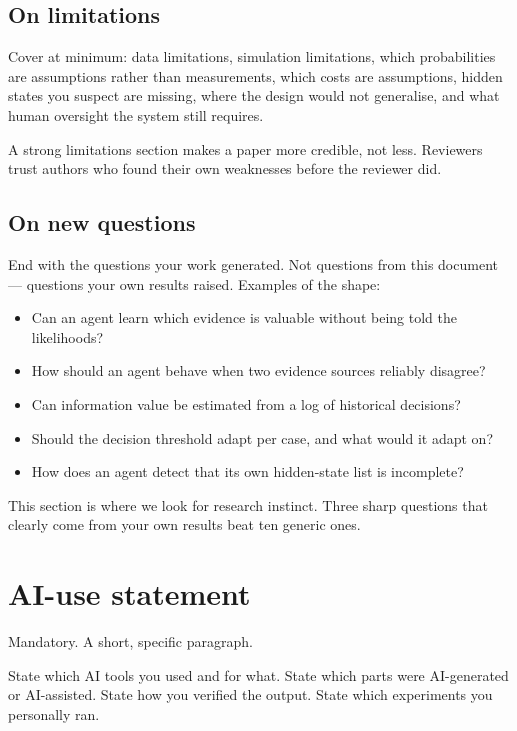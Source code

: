 \documentclass[11pt,a4paper]{article}
\begin{document}
\subsection{On limitations}

Cover at minimum: data limitations, simulation limitations, which probabilities are assumptions
rather than measurements, which costs are assumptions, hidden states you suspect are missing,
where the design would not generalise, and what human oversight the system still requires.

A strong limitations section makes a paper more credible, not less. Reviewers trust authors who
found their own weaknesses before the reviewer did.

\subsection{On new questions}

End with the questions your work generated. Not questions from this document --- questions your
own results raised. Examples of the shape:

\begin{itemize}
  \item Can an agent learn which evidence is valuable without being told the likelihoods?
  \item How should an agent behave when two evidence sources reliably disagree?
  \item Can information value be estimated from a log of historical decisions?
  \item Should the decision threshold adapt per case, and what would it adapt on?
  \item How does an agent detect that its own hidden-state list is incomplete?
\end{itemize}

This section is where we look for research instinct. Three sharp questions that clearly come
from your own results beat ten generic ones.

\section{AI-use statement}
\label{sec:aiuse}

Mandatory. A short, specific paragraph.

State which AI tools you used and for what. State which parts were AI-generated or AI-assisted.
State how you verified the output. State which experiments you personally ran.
\end{document}
